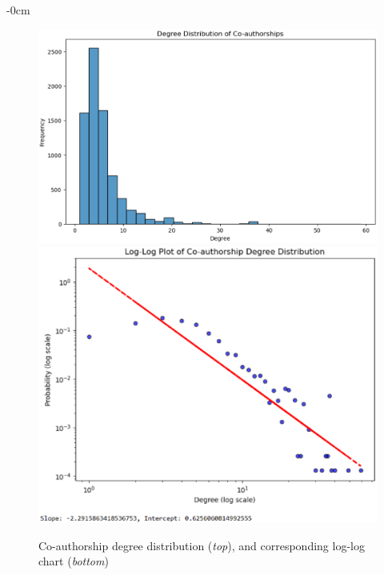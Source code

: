 \documentclass[jmse,review,submit,pdftex,moreauthors]{Definitions/mdpi}
\begin{document}
\begin{adjustwidth}{-\extralength}{0cm}
\begin{figure}[H]
	\centering
	\includegraphics[height=0.2\textheight, keepaspectratio]{pics/coauthorship_degree_distribution.eps}
	\includegraphics[height=0.2\textheight, keepaspectratio]{pics/coauthorship_degree_distribution_loglog_chart.eps}
	\caption{Co-authorship degree distribution (\textit{top}), and corresponding log-log chart (\textit{bottom})}\label{fig:fig3}
\end{figure}


\end{adjustwidth}
\end{document}
